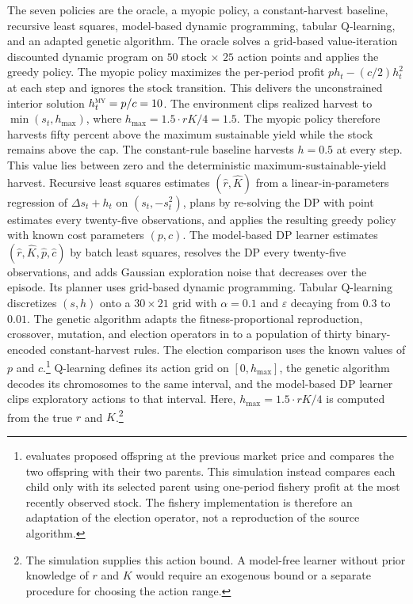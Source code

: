 The seven policies are the oracle, a myopic policy, a constant-harvest baseline, recursive least squares, model-based dynamic programming, tabular Q-learning, and an adapted genetic algorithm.
The oracle solves a grid-based value-iteration discounted dynamic program on $50$ stock $\times$ $25$ action points and applies the greedy policy.
The myopic policy maximizes the per-period profit $p h_t - (c/2) h_t^2$ at each step and ignores the stock transition.
This delivers the unconstrained interior solution $h_t^{\textsc{my}} = p / c = 10$.
The environment clips realized harvest to $\min(s_t, h_{\max})$, where $h_{\max} = 1.5 \cdot rK/4 = 1.5$. The myopic policy therefore harvests fifty percent above the maximum sustainable yield while the stock remains above the cap.
The constant-rule baseline harvests $h = 0.5$ at every step. This value lies between zero and the deterministic maximum-sustainable-yield harvest.
Recursive least squares estimates $(\hat r, \hat K)$ from a linear-in-parameters regression of $\Delta s_t + h_t$ on $(s_t, -s_t^2)$, plans by re-solving the DP with point estimates every twenty-five observations, and applies the resulting greedy policy with known cost parameters $(p, c)$.
The model-based DP learner estimates $(\hat r, \hat K, \hat p, \hat c)$ by batch least squares, resolves the DP every twenty-five observations, and adds Gaussian exploration noise that decreases over the episode. Its planner uses grid-based dynamic programming.
Tabular Q-learning discretizes $(s, h)$ onto a $30 \times 21$ grid with $\alpha = 0.1$ and $\varepsilon$ decaying from $0.3$ to $0.01$.
The genetic algorithm adapts the fitness-proportional reproduction, crossover, mutation, and election operators in \citet{Arifovic1994} to a population of thirty binary-encoded constant-harvest rules. The election comparison uses the known values of $p$ and $c$.\footnote{\citet{Arifovic1994} evaluates proposed offspring at the previous market price and compares the two offspring with their two parents. This simulation instead compares each child only with its selected parent using one-period fishery profit at the most recently observed stock. The fishery implementation is therefore an adaptation of the election operator, not a reproduction of the source algorithm.}
Q-learning defines its action grid on $[0,h_{\max}]$, the genetic algorithm decodes its chromosomes to the same interval, and the model-based DP learner clips exploratory actions to that interval. Here, $h_{\max} = 1.5 \cdot r K / 4$ is computed from the true $r$ and $K$.\footnote{The simulation supplies this action bound. A model-free learner without prior knowledge of $r$ and $K$ would require an exogenous bound or a separate procedure for choosing the action range.}

